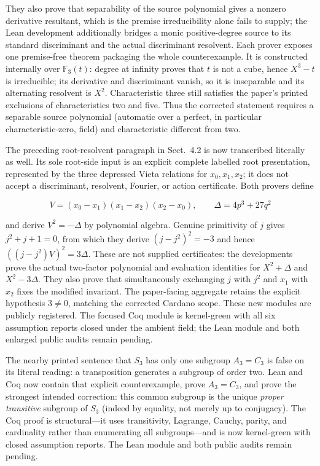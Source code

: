 \documentclass[11pt,a4paper,oneside]{article}
\begin{document}
They also prove that separability of the source polynomial gives a nonzero
derivative resultant, which is the premise irreducibility alone fails to
supply; the Lean development additionally bridges a monic positive-degree
source to its standard discriminant and the actual discriminant resolvent.
Each prover exposes one premise-free theorem packaging the whole
counterexample.  It is constructed internally over
$\mathbb F_3(t)$: degree at infinity proves that $t$ is not a cube, hence
$X^3-t$ is irreducible; its derivative and discriminant vanish, so it is
inseparable and its alternating resolvent is $X^2$.  Characteristic three
still satisfies the paper's printed exclusions of characteristics two and
five.  Thus the corrected statement requires a separable source polynomial
(automatic over a perfect, in particular characteristic-zero, field) and
characteristic different from two.

The preceding root-resolvent paragraph in Sect.~4.2 is now transcribed
literally as well.  Its sole root-side input is an explicit complete labelled
root presentation, represented by the three depressed Vieta relations for
$x_0,x_1,x_2$; it does not accept a discriminant, resolvent, Fourier, or
action certificate.  Both provers define

\[
 V=(x_0-x_1)(x_1-x_2)(x_2-x_0),\qquad
 \Delta=4p^3+27q^2
\]

and derive $V^2=-\Delta$ by polynomial algebra.  Genuine primitivity of
$j$ gives $j^2+j+1=0$, from which they derive
$(j-j^2)^2=-3$ and hence $((j-j^2)V)^2=3\Delta$.  These are not supplied
certificates: the developments prove the actual two-factor polynomial and
evaluation identities for $X^2+\Delta$ and $X^2-3\Delta$.  They also prove
that simultaneously exchanging $j$ with $j^2$ and $x_1$ with $x_2$ fixes
the modified invariant.  The paper-facing aggregate retains the explicit
hypothesis $3\ne0$, matching the corrected Cardano scope.  These new modules
are publicly registered.  The focused Coq module is kernel-green with all
six assumption reports closed under the ambient field; the Lean module and
both enlarged public audits remain pending.

The nearby printed sentence that $S_3$ has only one subgroup
$A_3=C_3$ is false on its literal reading: a transposition generates a
subgroup of order two.  Lean and Coq now contain that explicit counterexample,
prove $A_3=C_3$, and prove the strongest intended correction: this common
subgroup is the unique \emph{proper transitive} subgroup of $S_3$ (indeed by
equality, not merely up to conjugacy).  The Coq proof is structural---it uses
transitivity, Lagrange, Cauchy, parity, and cardinality rather than enumerating
all subgroups---and is now kernel-green with closed assumption reports.  The
Lean module and both public audits remain pending.
\end{document}
